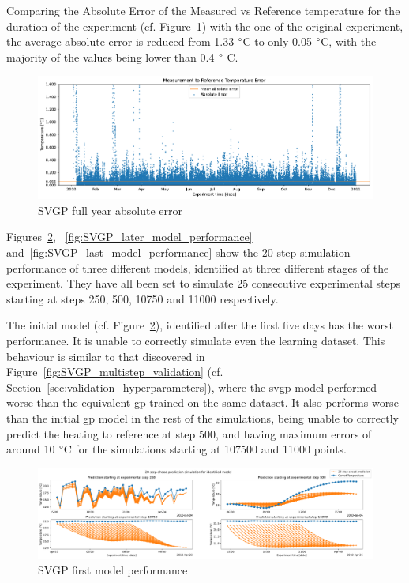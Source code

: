 \clearpage

Comparing the Absolute Error of the Measured vs Reference temperature for the
duration of the experiment (cf. Figure~\ref{fig:SVGP_fullyear_abserr}) with the
one of the original experiment, the average absolute error is reduced from 1.33
$\degree$C to only 0.05 $\degree$C, with the majority of the values being lower
than 0.4 $\degree$ C. 

\begin{figure}[ht]
    \centering
    \includegraphics[width =
    \textwidth]{Plots/1_SVGP_480pts_inf_window_12_averageYear_abserr.pdf}
    \caption{SVGP full year absolute error}
    \label{fig:SVGP_fullyear_abserr}
\end{figure}

Figures~\ref{fig:SVGP_first_model_performance},
~\ref{fig:SVGP_later_model_performance}
and~\ref{fig:SVGP_last_model_performance} show the 20-step simulation performance of three
different models, identified at three different stages of the experiment. They
have all been set to simulate 25 consecutive experimental steps starting at
steps 250, 500, 10750 and 11000 respectively.

The initial model (cf. Figure~\ref{fig:SVGP_first_model_performance}),
identified after the first five days has the worst performance. It is unable to
correctly simulate even the learning dataset. This behaviour is similar to that
discovered in Figure~\ref{fig:SVGP_multistep_validation}
(cf. Section~\ref{sec:validation_hyperparameters}), where the \acrshort{svgp}
model performed worse than the equivalent \acrshort{gp} trained on the same
dataset. It also performs worse than the initial \acrshort{gp} model in the rest
of the simulations, being unable to correctly predict the heating to reference
at step 500, and having maximum errors of around 10 $\degree$C for the simulations
starting at 107500 and 11000 points.

\begin{figure}[ht]
    \centering
    \includegraphics[width =
    \textwidth]{Plots/1_SVGP_480pts_inf_window_12_averageYear_first_model_performance.pdf}
    \caption{SVGP first model performance}
    \label{fig:SVGP_first_model_performance}
\end{figure}


